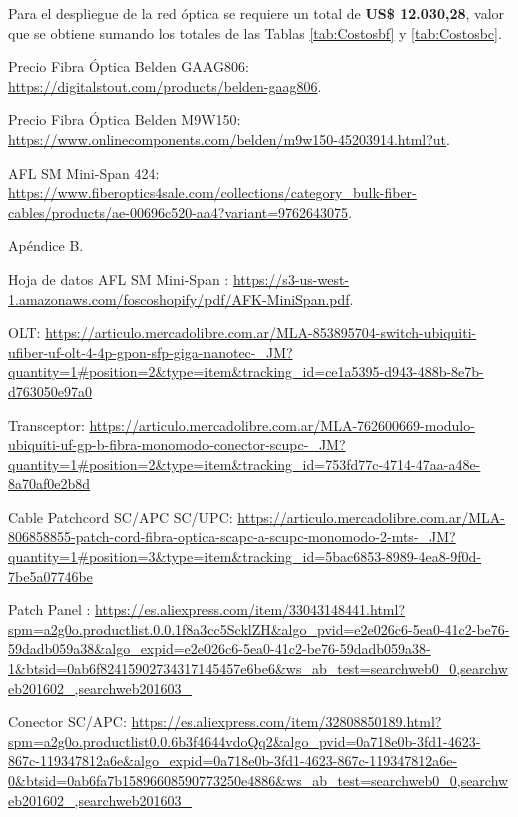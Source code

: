 Para el despliegue de la red óptica se requiere un total de  \textbf{US\$ 12.030,28}, valor que se obtiene sumando los totales de las Tablas \ref{tab:Costosbf} y \ref{tab:Costosbc}.




\newpage






\begin{thebibliography}{99}
 Precio Fibra Óptica Belden GAAG806: {\tiny \url{https://digitalstout.com/products/belden-gaag806}}.

 Precio Fibra Óptica Belden M9W150: {\tiny \url{https://www.onlinecomponents.com/belden/m9w150-45203914.html?ut}}.

 AFL SM Mini-Span 424: {\tiny \url{https://www.fiberoptics4sale.com/collections/category_bulk-fiber-cables/products/ae-00696c520-aa4?variant=9762643075}}.

 Apéndice B.

 Hoja de datos AFL SM Mini-Span : {\tiny \url{https://s3-us-west-1.amazonaws.com/foscoshopify/pdf/AFK-MiniSpan.pdf}}.

 OLT: {\tiny \url{https://articulo.mercadolibre.com.ar/MLA-853895704-switch-ubiquiti-ufiber-uf-olt-4-4p-gpon-sfp-giga-nanotec-_JM?quantity=1#position=2&type=item&tracking_id=ce1a5395-d943-488b-8e7b-d763050e97a0}}

 Transceptor: {\tiny \url{https://articulo.mercadolibre.com.ar/MLA-762600669-modulo-ubiquiti-uf-gp-b-fibra-monomodo-conector-scupc-_JM?quantity=1#position=2&type=item&tracking_id=753fd77c-4714-47aa-a48e-8a70af0e2b8d}}

 Cable Patchcord SC/APC SC/UPC: {\tiny \url{https://articulo.mercadolibre.com.ar/MLA-806858855-patch-cord-fibra-optica-scapc-a-scupc-monomodo-2-mts-_JM?quantity=1#position=3&type=item&tracking_id=5bac6853-8989-4ea8-9f0d-7be5a07746be}}

 Patch Panel : {\tiny \url{https://es.aliexpress.com/item/33043148441.html?spm=a2g0o.productlist.0.0.1f8a3cc5ScklZH&algo_pvid=e2e026c6-5ea0-41c2-be76-59dadb059a38&algo_expid=e2e026c6-5ea0-41c2-be76-59dadb059a38-1&btsid=0ab6f82415902734317145457e6be6&ws_ab_test=searchweb0_0,searchweb201602_,searchweb201603_}}

 Conector SC/APC: {\tiny \url{https://es.aliexpress.com/item/32808850189.html?spm=a2g0o.productlist0.0.6b3f4644vdoQq2&algo_pvid=0a718e0b-3fd1-4623-867c-119347812a6e&algo_expid=0a718e0b-3fd1-4623-867c-119347812a6e-0&btsid=0ab6fa7b15896608590773250e4886&ws_ab_test=searchweb0_0,searchweb201602_,searchweb201603_}}


\end{thebibliography}
